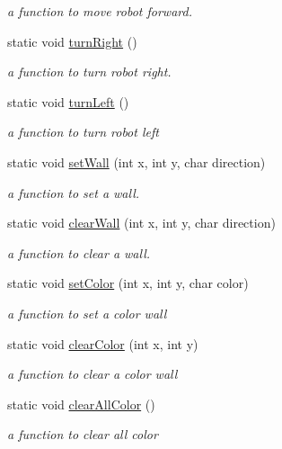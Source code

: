 \begin{DoxyCompactItemize}
\begin{DoxyCompactList}\small\item\em a function to move robot forward. \end{DoxyCompactList}\item 
static void \hyperlink{classfp_1_1_a_p_i_ac346f1c3ae7a39829c16681be2f25e92}{turn\+Right} ()
\begin{DoxyCompactList}\small\item\em a function to turn robot right. \end{DoxyCompactList}\item 
static void \hyperlink{classfp_1_1_a_p_i_aacf09d263f8c47e7f3eae1f348db0b91}{turn\+Left} ()
\begin{DoxyCompactList}\small\item\em a function to turn robot left \end{DoxyCompactList}\item 
static void \hyperlink{classfp_1_1_a_p_i_a5f209e53ce63ad478bb67b120b34c7dd}{set\+Wall} (int x, int y, char direction)
\begin{DoxyCompactList}\small\item\em a function to set a wall. \end{DoxyCompactList}\item 
static void \hyperlink{classfp_1_1_a_p_i_a19710a245ad8c075066046617ea3377b}{clear\+Wall} (int x, int y, char direction)
\begin{DoxyCompactList}\small\item\em a function to clear a wall. \end{DoxyCompactList}\item 
static void \hyperlink{classfp_1_1_a_p_i_a5a7c59cffb4ca483e8c1334a99a04dbb}{set\+Color} (int x, int y, char color)
\begin{DoxyCompactList}\small\item\em a function to set a color wall \end{DoxyCompactList}\item 
static void \hyperlink{classfp_1_1_a_p_i_a5ab1560f68fb54993c8b3316177040a5}{clear\+Color} (int x, int y)
\begin{DoxyCompactList}\small\item\em a function to clear a color wall \end{DoxyCompactList}\item 
static void \hyperlink{classfp_1_1_a_p_i_a68f86debe50e6e2ae0c1fde795a1cfb6}{clear\+All\+Color} ()
\begin{DoxyCompactList}\small\item\em a function to clear all color \end{DoxyCompactList}\item 

\end{DoxyCompactItemize}
